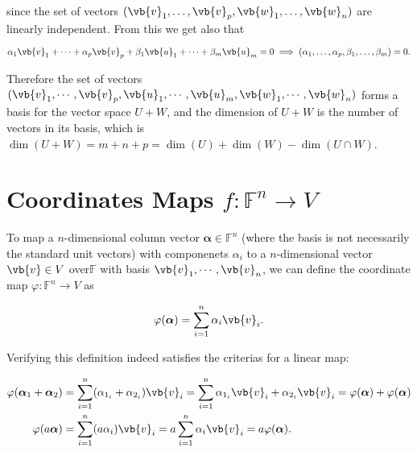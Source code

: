 \documentclass[a4paper,12pt]{report}
\begin{document}
{since the set of vectors \((\vb{v} _{1}, \ldots , \vb{v} _{p}, \vb{w} _{1}, \ldots , \vb{w} _{n}    )\) are linearly independent. From this we get also that 

\begin{equation}
    \alpha _{1}\vb{v} _{1} + \cdots + \alpha _{p}\vb{v} _{p} + \beta _{1}\vb{u} _{1} + \cdots + \beta _{m} \vb{u} _{m} = 0 \implies (\alpha _{1}, \ldots , \alpha _{p}, \beta _{1}, \ldots , \beta _{m}    ) = 0.
\end{equation}

Therefore the set of vectors \((\vb{v}_1, \cdots, \vb{v}_p, \vb{u}_1, \cdots, \vb{u}_m, \vb{w}_1, \cdots, \vb{w}_n)\) forms a basis for the vector space \(U+W\), and the dimension of \(U+W\) is the number of vectors in its basis, which is \(\dim (U+W) = m+n+p = \dim (U) + \dim (W) - \dim (U \cap W)\).
} 


\section{Coordinates Maps \(f: \mathbb{F}^{n} \rightarrow V\) }

To map a \(n\)-dimensional column vector \(\boldsymbol{\alpha } \in \mathbb{F}^{n} \) (where the basis is not necessarily the standard unit vectors) with componenets \(\alpha _{i} \)  to a \(n\)-dimensional vector \(\vb{v} \in V\) over\(\mathbb{F}\) with basis \(\vb{v}_1, \cdots, \vb{v}_n \), we can define the coordinate map \(\varphi : \mathbb{F}^{n} \rightarrow V \) as      

\begin{equation}
    \varphi (\boldsymbol{\alpha } ) = \sum_{i=1}^{n} \alpha _{i} \vb{v} _{i} . 
\end{equation}

Verifying this definition indeed satisfies the criterias for a linear map:

\begin{equation}
    \begin{aligned}
    \varphi (\boldsymbol{\alpha }_{1}  + \boldsymbol{\alpha }_{2}   )  &= \sum_{i=1}^{n} (\alpha _{1_i} + \alpha  _{2_i}   )\vb{v} _{i} = \sum_{i=1}^{n} \alpha _{1_i} \vb{v} _{i}  + \alpha  _{2_i} \vb{v} _{i} = \varphi (\boldsymbol{\alpha } ) + \varphi (\boldsymbol{\alpha } )   \\
    \varphi (a \boldsymbol{\alpha } ) &= \sum_{i=1}^{n} (a \alpha _{i} ) \vb{v} _{i} = a \sum_{i=1}^{n} \alpha _{i} \vb{v} _{i} = a \varphi (\boldsymbol{\alpha } ). 
    \end{aligned}
\end{equation}
\end{document}
